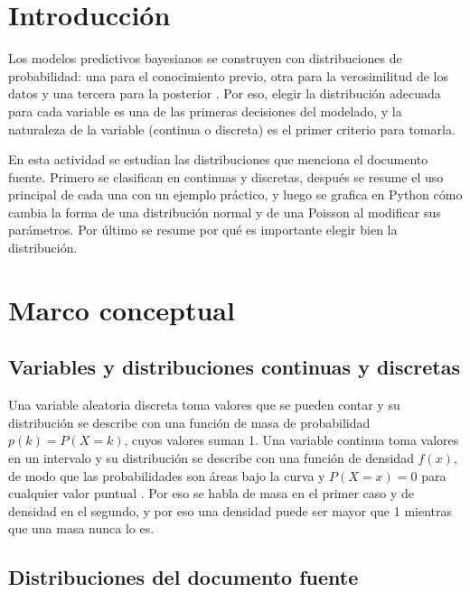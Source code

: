 \documentclass[11pt,letterpaper]{article}
\begin{document}
\portada
\indicegeneral


\section{Introducción}

Los modelos predictivos bayesianos se construyen con distribuciones de probabilidad: una para el conocimiento previo, otra para la verosimilitud de los datos y una tercera para la posterior \parencite{tecnm2026_documento_fuente}. Por eso, elegir la distribución adecuada para cada variable es una de las primeras decisiones del modelado, y la naturaleza de la variable (continua o discreta) es el primer criterio para tomarla.

En esta actividad se estudian las distribuciones que menciona el documento fuente. Primero se clasifican en continuas y discretas, después se resume el uso principal de cada una con un ejemplo práctico, y luego se grafica en Python cómo cambia la forma de una distribución normal y de una Poisson al modificar sus parámetros. Por último se resume por qué es importante elegir bien la distribución.

\section{Marco conceptual}

\subsection{Variables y distribuciones continuas y discretas}

Una variable aleatoria discreta toma valores que se pueden contar y su distribución se describe con una función de masa de probabilidad $p(k) = P(X = k)$, cuyos valores suman 1. Una variable continua toma valores en un intervalo y su distribución se describe con una función de densidad $f(x)$, de modo que las probabilidades son áreas bajo la curva y $P(X = x) = 0$ para cualquier valor puntual \parencite{tecnm2026_documento_fuente}. Por eso se habla de masa en el primer caso y de densidad en el segundo, y por eso una densidad puede ser mayor que 1 mientras que una masa nunca lo es.

\subsection{Distribuciones del documento fuente}
\end{document}
